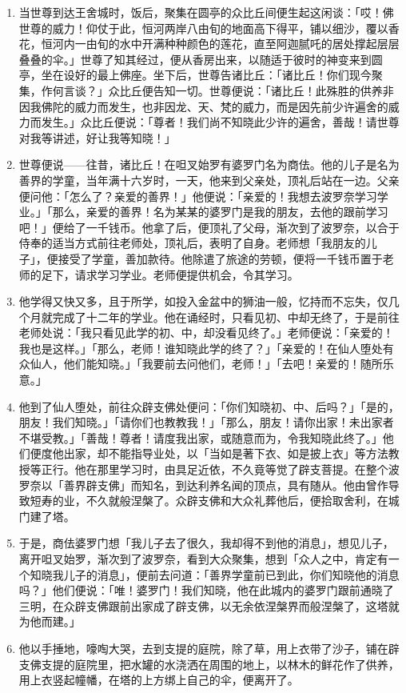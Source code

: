 \begin{enumerate}
\item 当世尊到达王舍城时，饭后，聚集在圆亭的众比丘间便生起这闲谈：「哎！佛世尊的威力！仰仗于此，恒河两岸八由旬的地面高下得平，铺以细沙，覆以香花，恒河内一由旬的水中开满种种颜色的莲花，直至阿迦腻吒的居处撑起层层叠叠的伞。」世尊了知其经过，便从香房出来，以随适于彼时的神变来到圆亭，坐在设好的最上佛座。坐下后，世尊告诸比丘：「诸比丘！你们现今聚集，作何言谈？」众比丘便告知一切。世尊便说：「诸比丘！此殊胜的供养非因我佛陀的威力而发生，也非因龙、天、梵的威力，而是因先前少许遍舍的威力而发生。」众比丘便说：「尊者！我们尚不知晓此少许的遍舍，善哉！请世尊对我等讲述，好让我等知晓！」
\item 世尊便说——往昔，诸比丘！在呾叉始罗有婆罗门名为商佉。他的儿子是名为善界的学童，当年满十六岁时，一天，他来到父亲处，顶礼后站在一边。父亲便问他：「怎么了？亲爱的善界！」他便说：「亲爱的！我想去波罗奈学习学业。」「那么，亲爱的善界！名为某某的婆罗门是我的朋友，去他的跟前学习吧！」便给了一千钱币。他拿了后，便顶礼了父母，渐次到了波罗奈，以合于侍奉的适当方式前往老师处，顶礼后，表明了自身。老师想「我朋友的儿子」，便接受了学童，善加款待。他除遣了旅途的劳顿，便将一千钱币置于老师的足下，请求学习学业。老师便提供机会，令其学习。
\item 他学得又快又多，且于所学，如投入金盆中的狮油一般，忆持而不忘失，仅几个月就完成了十二年的学业。他在诵经时，只看见初、中却无终了，于是前往老师处说：「我只看见此学的初、中，却没看见终了。」老师便说：「亲爱的！我也是这样。」「那么，老师！谁知晓此学的终了？」「亲爱的！在仙人堕处有众仙人，他们能知晓。」「我要前去问他们，老师！」「去吧！亲爱的！随所乐意。」
\item 他到了仙人堕处，前往众辟支佛处便问：「你们知晓初、中、后吗？」「是的，朋友！我们知晓。」「请你们也教教我！」「那么，朋友！请你出家！未出家者不堪受教。」「善哉！尊者！请度我出家，或随意而为，令我知晓此终了。」他们便度他出家，却不能指导业处，以「当如是著下衣、如是披上衣」等方法教授等正行。他在那里学习时，由具足近依，不久竟等觉了辟支菩提。在整个波罗奈以「善界辟支佛」而知名，到达利养名闻的顶点，具有随从。他由曾作导致短寿的业，不久就般涅槃了。众辟支佛和大众礼葬他后，便拾取舍利，在城门建了塔。
\item 于是，商佉婆罗门想「我儿子去了很久，我却得不到他的消息」，想见儿子，离开呾叉始罗，渐次到了波罗奈，看到大众聚集，想到「众人之中，肯定有一个知晓我儿子的消息」，便前去问道：「善界学童前已到此，你们知晓他的消息吗？」他们便说：「唯！婆罗门！我们知晓，他在此城内的婆罗门跟前通晓了三明，在众辟支佛跟前出家成了辟支佛，以无余依涅槃界而般涅槃了，这塔就为他而建。」
\item 他以手捶地，嚎啕大哭，去到支提的庭院，除了草，用上衣带了沙子，铺在辟支佛支提的庭院里，把水罐的水浇洒在周围的地上，以林木的鲜花作了供养，用上衣竖起幢幡，在塔的上方绑上自己的伞，便离开了。

\end{enumerate}
